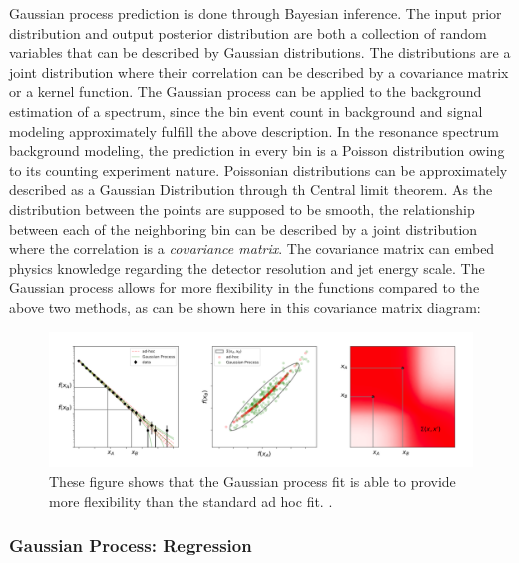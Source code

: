     Gaussian process prediction is done through Bayesian inference. The input prior distribution and output posterior distribution are both a collection of random variables that can be described by Gaussian distributions. The distributions are a joint distribution where their correlation can be described by a covariance matrix or a kernel function. 
    The Gaussian process can be applied to the background estimation of a spectrum, since the bin event count in background and signal modeling approximately fulfill the above description. In the resonance spectrum background modeling, the prediction in every bin is a Poisson distribution owing to its counting experiment nature. Poissonian distributions can be approximately described as a Gaussian Distribution through th
    Central limit theorem. As the distribution between the points are supposed to be smooth, the relationship between each of the neighboring bin can be described by a joint distribution where the correlation is a \textit{covariance matrix}. The covariance matrix can embed physics knowledge regarding the detector resolution and jet energy scale. The Gaussian process allows for more flexibility in the functions compared to the above two methods, as can be shown here in this covariance matrix diagram:

    \begin{figure}[!htb]
        \begin{center}
            \includegraphics[width=1.1\textwidth]{figures/chapter_analysismethod/GP}
            \caption{
                These figure shows that the Gaussian process fit is able to provide more flexibility than the standard ad hoc fit. \cite{frate2017modeling}.
            }
            \label{signalinjection}
        \end{center}
    \end{figure}



    \subsubsection{Gaussian Process: Regression}


